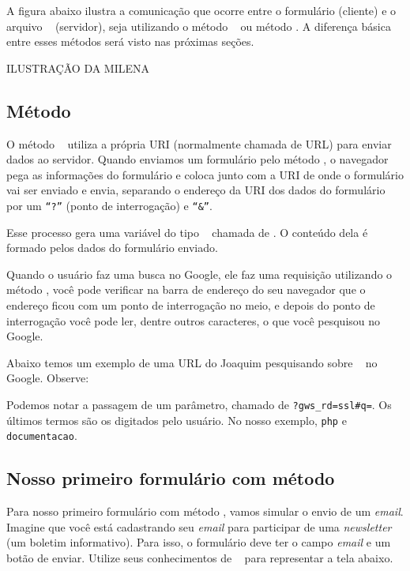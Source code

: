 A figura abaixo ilustra a comunicação que ocorre entre o formulário (cliente) e o arquivo 
\php~ (servidor), seja utilizando o método \metodoGET~ ou método \metodoPOST. A diferença básica 
entre esses métodos será visto nas próximas seções. 

ILUSTRAÇÃO DA MILENA

\subsection{Método \metodoGET}
\label{metodo-get}

O método \metodoGET~ utiliza a própria URI (normalmente chamada de URL) para enviar dados ao 
servidor. Quando enviamos um formulário pelo método \metodoGET, o navegador pega as informações 
do formulário e coloca junto com a URI de onde o formulário vai ser enviado e envia, 
separando o endereço da URI dos dados do formulário por um \texttt{``?''} (ponto de interrogação) 
e \texttt{``\&''}.

Esse processo gera uma variável do tipo \tipoarray~ chamada de \variavelget. O conteúdo dela é
formado pelos dados do formulário enviado.

Quando o usuário faz uma busca no Google, ele faz uma requisição utilizando o método \metodoGET, 
você pode verificar na barra de endereço do seu navegador que o endereço ficou com um ponto de 
interrogação no meio, e depois do ponto de interrogação você pode ler, dentre outros caracteres, 
o que você pesquisou no Google.

Abaixo temos um exemplo de uma URL do Joaquim pesquisando sobre \php~ no Google. Observe:


Podemos notar a passagem de um parâmetro, chamado de \texttt{?gws\_rd=ssl\#q=}. Os últimos termos
são os digitados pelo usuário. No nosso exemplo, \texttt{php} e \texttt{documentacao}.

\subsection{Nosso primeiro formulário com método \metodoGET}
\label{nosso-primeiro-formulario-com-metodo-get}

Para nosso primeiro formulário com método \metodoGET, vamos simular o envio de um 
\textit{email}. Imagine que você está cadastrando seu \textit{email} para participar 
de uma \textit{newsletter} (um boletim informativo). Para isso, o formulário deve 
ter o campo \textit{email} e um botão de enviar. Utilize seus conhecimentos de \html~ 
para representar a tela abaixo.

